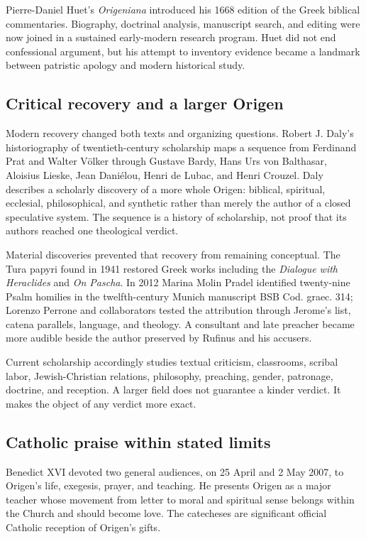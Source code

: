 Pierre-Daniel Huet's \emph{Origeniana} introduced his 1668 edition of the Greek
biblical commentaries. Biography, doctrinal analysis, manuscript search, and
editing were now joined in a sustained early-modern research program. Huet did
not end confessional argument, but his attempt to inventory evidence became a
landmark between patristic apology and modern historical study.

\subsection{Critical recovery and a larger Origen}

Modern recovery changed both texts and organizing questions. Robert J. Daly's
historiography of twentieth-century scholarship maps a sequence from Ferdinand
Prat and Walter V\"olker through Gustave Bardy, Hans Urs von Balthasar, Aloisius
Lieske, Jean Dani\'elou, Henri de Lubac, and Henri Crouzel. Daly describes a
scholarly discovery of a more whole Origen: biblical,
spiritual, ecclesial, philosophical, and synthetic rather than merely the
author of a closed speculative system. The sequence is a history of
scholarship, not proof that its authors reached one theological verdict.

Material discoveries prevented that recovery from remaining conceptual. The
Tura papyri found in 1941 restored Greek works including the \emph{Dialogue
with Heraclides} and \emph{On Pascha}. In 2012 Marina Molin Pradel identified
twenty-nine Psalm homilies in the twelfth-century Munich manuscript BSB Cod.
graec. 314; Lorenzo Perrone and collaborators tested the attribution through
Jerome's list, catena parallels, language, and theology. A consultant and late
preacher became more audible beside the author preserved by Rufinus and his
accusers.

Current scholarship accordingly studies textual criticism, classrooms,
scribal labor, Jewish-Christian relations, philosophy, preaching, gender,
patronage, doctrine, and reception. A larger field does not guarantee a kinder
verdict. It makes the object of any verdict more exact.

\subsection{Catholic praise within stated limits}

Benedict XVI devoted two general audiences, on 25 April and 2 May 2007, to
Origen's life, exegesis, prayer, and teaching. He presents Origen as a major
teacher whose movement from letter to moral and spiritual sense belongs within
the Church and should become love. The catecheses are significant official
Catholic reception of Origen's gifts.

